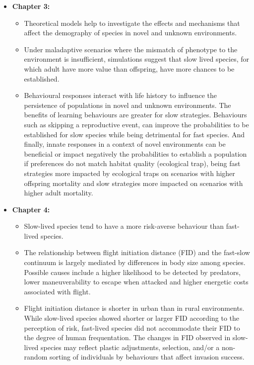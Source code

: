 \begin{itemize}
  \item \textbf{Chapter 3:}
  \begin{itemize}
    \item Theoretical models help to investigate the effects and mechanisms
that affect the demography of species in novel and unknown environments.
    \item Under maladaptive scenarios where the mismatch of phenotype to the
environment is insufficient, simulations suggest that slow lived species,
for which adult have more value than offspring, have more chances to be
established.
    \item Behavioural responses interact with life history to influence the
persistence of populations in novel and unknown environments. The benefits of
learning behaviours are greater for slow strategies. Behaviours such
as skipping a reproductive event, can improve the probabilities to be
established for slow species while being detrimental for fast species. And
finally, innate responses in a context of novel environments can be beneficial
or impact negatively the probabilities to establish a population if preferences
do not match habitat quality (ecological trap), being fast strategies more
impacted by ecological traps on scenarios with higher offspring mortality and
slow strategies more impacted on scenarios with higher adult mortality.
  \end{itemize}


  \item \textbf{Chapter 4:}
  \begin{itemize}
    \item  Slow-lived species tend to have a more risk-averse behaviour than
fast-lived species.
    \item The relationship between flight initiation distance (FID) and the
fast-slow continuum is largely mediated by differences in body size among
species. Possible causes include a higher likelihood to be detected by
predators, lower maneuverability to escape when attacked and higher energetic
costs associated with flight.
    \item Flight initiation distance is shorter in urban than in rural
environments. While slow-lived species showed shorter or larger FID
according to the perception of risk, fast-lived species did not accommodate
their FID to the degree of human frequentation. The changes in FID observed in
slow-lived species may reflect plastic adjustments, selection, and/or a
non-random sorting of individuals by behaviours that affect invasion success.
  \end{itemize}


\end{itemize}
